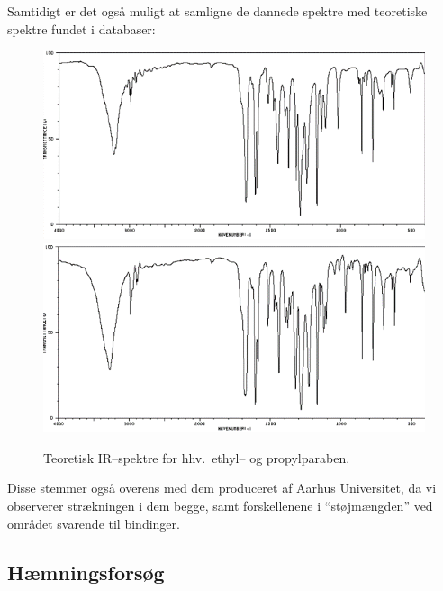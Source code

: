     Samtidigt er det også muligt at samligne de dannede spektre med teoretiske spektre fundet i databaser:
    \begin{figure}[H]
        \includegraphics[width=.48\linewidth]{billeder/irethyl}
        \includegraphics[width=.48\linewidth]{billeder/irpropyl}
        \caption{Teoretisk IR--spektre for hhv.\ ethyl-- og propylparaben.}
    \end{figure}
    Disse stemmer også overens med dem produceret af Aarhus Universitet, da vi observerer  strækningen i dem begge, samt forskellenene i ``støjmængden'' ved området svarende til  bindinger.

    \subsection{Hæmningsforsøg}
